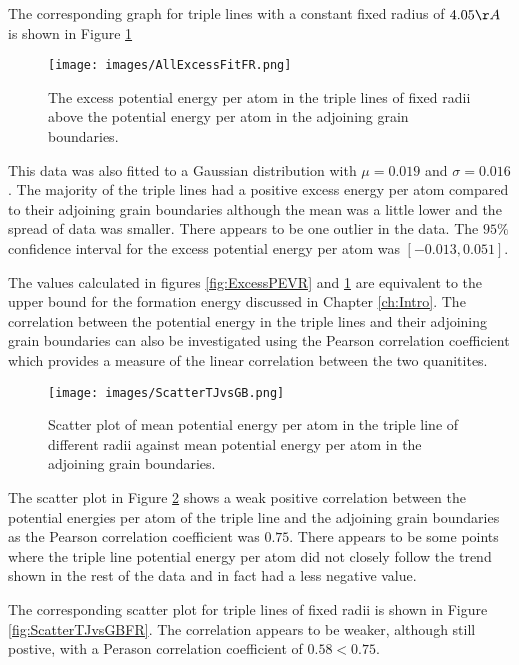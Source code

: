 \documentclass[12pt,a4paper]{book}
\begin{document}
The corresponding graph for triple lines with a constant fixed radius of $4.05 \AA$ is shown in Figure \ref{fig:ExcessPEFR}

\begin{figure}[H]
	\texttt{[image: images/AllExcessFitFR.png]} 
	\label{fig:ExcessPEFR}
	\caption{The excess potential energy per atom in the triple lines of fixed radii above the potential energy per atom in the adjoining grain boundaries.}
\end{figure}

This data was also fitted to a Gaussian distribution with $\mu = 0.019$ and $\sigma = 0.016$. The majority of the triple lines had  a positive excess energy per atom compared to their adjoining grain boundaries although the mean was a little lower and the spread of data was smaller. There appears to be one outlier in the data. The $95\%$ confidence interval for the excess potential energy per atom was $[-0.013, 0.051]$.

The values calculated in figures \ref{fig:ExcessPEVR} and \ref{fig:ExcessPEFR} are equivalent to the upper bound for the formation energy discussed in Chapter \ref{ch:Intro}. The correlation between the potential energy in the triple lines and their adjoining grain boundaries can also be investigated using the Pearson correlation coefficient which provides a measure of the linear correlation between the two quanitites.

\begin{figure}[H]
	\texttt{[image: images/ScatterTJvsGB.png]} 
	\label{fig:ScatterTJvsGB}
	\caption{Scatter plot of mean potential energy per atom in the triple line of different radii against mean potential energy per atom in the adjoining grain boundaries.}
\end{figure}

The scatter plot in Figure \ref{fig:ScatterTJvsGB} shows a weak positive correlation between the potential energies per atom of the triple line and the adjoining grain boundaries as the Pearson correlation coefficient was $0.75$. There appears to be some points where the triple line potential energy per atom did not closely follow the trend shown in the rest of the data and in fact had a less negative value. 

The corresponding scatter plot for triple lines of fixed radii is shown in Figure \ref{fig:ScatterTJvsGBFR}. The correlation appears to be weaker, although still postive, with a Perason correlation coefficient of $0.58 < 0.75$. 
\end{document}
